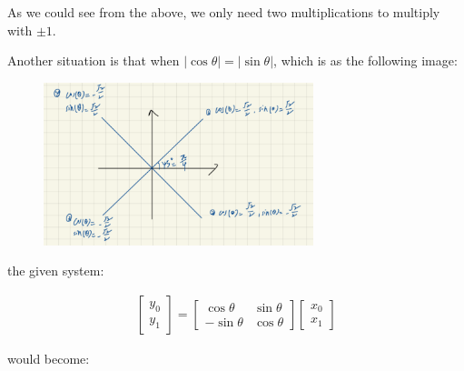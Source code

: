 \documentclass{article}
\begin{document}
\bigskip

As we could see from the above, we only need two multiplications to multiply with $\pm 1$.
\bigskip

Another situation is that when $|\cos \theta| = |\sin \theta|$, 
which is as the following image:

\begin{figure}[H]
    \centering
    \includegraphics[width=0.7\textwidth]{HW4_img/6.png}
\end{figure}

the given system:

\begin{align*}
    \begin{bmatrix}
        y_0 \\
        y_1 
    \end{bmatrix}
    = 
    \begin{bmatrix}
        \cos \theta & \sin \theta \\
        -\sin \theta & \cos \theta
    \end{bmatrix}
    \begin{bmatrix}
        x_0 \\
        x_1
    \end{bmatrix}
\end{align*}

would become:
\end{document}
